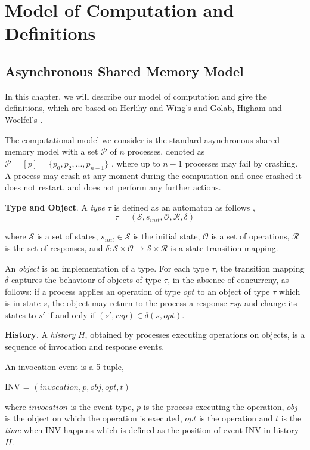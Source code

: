 
\chapter{Model of Computation and Definitions}
\section{Asynchronous Shared Memory Model}
In this chapter, we will describe our model of computation and give the definitions, which are based on Herlihy
and Wing's \cite{Herlihy:1990:LCC:78969.78972} and Golab, Higham and Woelfel's \cite{golab2011linearizable}.

The computational model we consider is the standard asynchronous shared memory model with a set $\mathcal{P}$
of $n$ processes, denoted as $\mathcal{P} = [p] =\{p_0, p_2,...,p_{n-1}\}$ , where up to $n-1$ processes may fail by crashing.
A process may crash at any moment during the computation and once crashed it does not restart,
and does not perform any further actions.

\textbf{Type and Object}.
A \emph{type} $\tau$ is defined as an automaton as follows \cite{InProc-GHHW2007a},
$$\tau = (\mathcal{S}, s_{init},\mathcal{O},\mathcal{R} ,\delta )$$

where $\mathcal{S}$ is a set of states, $s_{init} \in \mathcal{S}$ is the initial state, $\mathcal{O}$ is a set of
operations, $\mathcal{R}$ is the set of responses, and
$\delta :\mathcal{S} \times \mathcal{O} \to \mathcal{S} \times \mathcal{R}$ is a state transition mapping.

An \emph{object} is an implementation of a type. For each type $\tau$, the transition mapping $\delta$ captures the
behaviour of objects of type $\tau$, in the absence of concurreny,
as follows: if a process applies an operation of type $opt$ to an object of type $\tau$ which is in state $s$, the object
may return to the process a response $rsp$ and change its states to $s'$ if and only if $(s', rsp) \in \delta(s, opt)$.

\textbf{History}.
A \emph{history} $H$, obtained by processes executing
operations on objects, is a sequence of invocation
and response events.

An invocation event is a 5-tuple,
\begin{center}
INV = $(invocation, p, obj, opt, t)$
\end{center}
where $invocation$ is the event type, $p$ is the process executing the operation, $obj$ is the object on which the operation
is executed, $opt$ is the operation and $t$ is the \emph{time} when INV happens which is defined
as the position of event INV in history $H$.

